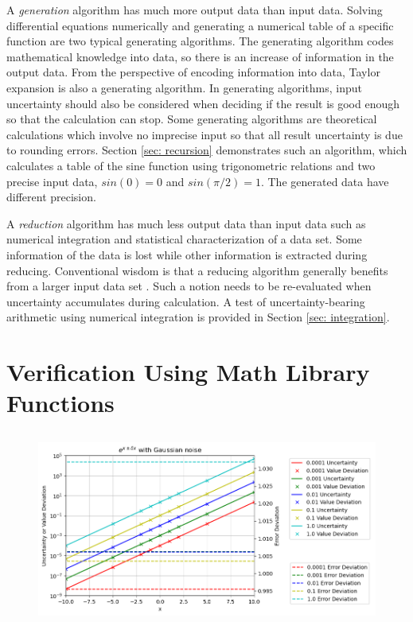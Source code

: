 \documentclass[twoside]{article}
\numberwithin{equation}{section}
\begin{document}
A \emph{generation} algorithm has much more output data than input data.  
Solving differential equations numerically and generating a numerical table of a specific function are two typical generating algorithms.  
The generating algorithm codes mathematical knowledge into data, so there is an increase of information in the output data.  
From the perspective of encoding information into data, Taylor expansion is also a generating algorithm. 
In generating algorithms, input uncertainty should also be considered when deciding if the result is good enough so that the calculation can stop.  
Some generating algorithms are theoretical calculations which involve no imprecise input so that all result uncertainty is due to rounding errors.  
Section \ref{sec: recursion} demonstrates such an algorithm, which calculates a table of the sine function using trigonometric relations and two precise input data, $sin(0)=0$ and $sin(\pi/2)=1$.  
The generated data have different precision.

A \emph{reduction} algorithm has much less output data than input data such as numerical integration and statistical characterization of a data set.  
Some information of the data is lost while other information is extracted during reducing.  
Conventional wisdom is that a reducing algorithm generally benefits from a larger input data set \cite{Probability_Statistics}.  
Such a notion needs to be re-evaluated when uncertainty accumulates during calculation.  
A test of uncertainty-bearing arithmetic using numerical integration is provided in Section \ref{sec: integration}.



\clearpage
\section{Verification Using Math Library Functions}
\label{sec: Math Library}

\begin{figure}[p]
\centering
\includegraphics[height=2.5in]{Exp_Dev.png} 
\label{fig: Exp_Dev}
\end{figure}
\end{document}
